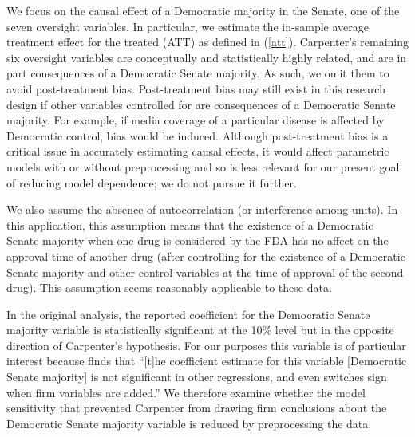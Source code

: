 \documentclass[11pt,titlepage]{article}
\begin{document}
We focus on the causal effect of a Democratic majority in the Senate,
one of the seven oversight variables. In particular, we estimate the
in-sample average treatment effect for the treated (ATT) as defined in
(\ref{att}).  Carpenter's remaining six oversight variables are
conceptually and statistically highly related, and are in part
consequences of a Democratic Senate majority.  As such, we omit them
to avoid post-treatment bias.  Post-treatment bias may still exist in
this research design if other variables controlled for are
consequences of a Democratic Senate majority.  For example, if media
coverage of a particular disease is affected by Democratic control,
bias would be induced.  Although post-treatment bias is a critical
issue in accurately estimating causal effects, it would affect
parametric models with or without preprocessing and so is less
relevant for our present goal of reducing model dependence; we do not
pursue it further.

We also assume the absence of autocorrelation (or interference among
units).  In this application, this assumption means that the existence
of a Democratic Senate majority when one drug is considered by the FDA
has no affect on the approval time of another drug (after
controlling for the existence of a Democratic Senate majority and
other control variables at the time of approval of the second drug).
This assumption seems reasonably applicable to these data.

In the original analysis, the reported coefficient for the Democratic
Senate majority variable is statistically significant at the 10\%
level but in the opposite direction of Carpenter's hypothesis.  For
our purposes this variable is of particular interest because
\citet[p.498]{Carpenter02} finds that ``[t]he coefficient estimate for
this variable [Democratic Senate majority] is not significant in other
regressions, and even switches sign when firm variables are added.''
We therefore examine whether the model sensitivity that prevented
Carpenter from drawing firm conclusions about the Democratic Senate
majority variable is reduced by preprocessing the data. 
\end{document}
